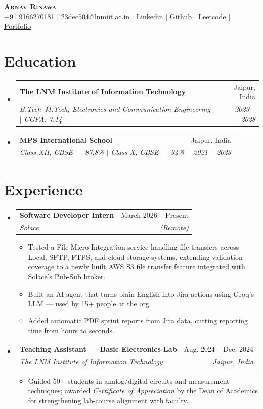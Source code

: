 \documentclass[letterpaper,11pt]{article}
\makeatletter
\newcommand{\resumeItem}[1]{
  \item\small{
    {#1 \vspace{-2pt}}
  }
}
\newcommand{\resumeSubheading}[4]{
  \vspace{-2pt}\item
    \begin{tabular*}{0.97\textwidth}[t]{l@{\extracolsep{\fill}}r}
      \textbf{#1} & #2 \\
      \textit{\small#3} & \textit{\small #4} \\
    \end{tabular*}\vspace{-7pt}
}
\newcommand{\resumeSubHeadingListStart}{\begin{itemize}[leftmargin=0.15in, label={}]}
\newcommand{\resumeSubHeadingListEnd}{\end{itemize}}
\newcommand{\resumeItemListStart}{\begin{itemize}}
\newcommand{\resumeItemListEnd}{\end{itemize}\vspace{-5pt}}
\makeatother
\begin{document}
\begin{center}
    \textbf{\Huge \scshape Arnav Rinawa} \\ \vspace{1pt}
    \small +91 9166270181 $|$
    \href{mailto:23dec504@lnmiit.ac.in}{\underline{23dec504@lnmiit.ac.in}} $|$
    \href{https://www.linkedin.com/in/arnav-rinawa}{\underline{Linkedin}} $|$
    \href{https://github.com/ARSOULGOD}{\underline{Github}} $|$
    \href{https://leetcode.com/u/arnav_rinawa}{\underline{Leetcode}} $|$
    \href{https://arsoulgod-github-io-git-main-arsoulgods-projects.vercel.app/}{\underline{Portfolio}}
\end{center}


\section{Education}
  \resumeSubHeadingListStart
    \resumeSubheading
      {The LNM Institute of Information Technology}{Jaipur, India}
      {B.Tech--M.Tech, Electronics and Communication Engineering $|$ CGPA: 7.14}{2023 -- 2028}
    \resumeSubheading
      {MPS International School}{Jaipur, India}
      {Class XII, CBSE --- 87.8\% $|$ Class X, CBSE --- 94\%}{2021 -- 2023}
  \resumeSubHeadingListEnd



\section{Experience}
  \resumeSubHeadingListStart
    \resumeSubheading
      {Software Developer Intern}{March 2026 -- Present}
      {Solace}{(Remote)}
      \resumeItemListStart
        \resumeItem{Tested a File Micro-Integration service handling file transfers across Local, SFTP, FTPS, and cloud storage systems, extending validation coverage to a newly built AWS S3 file transfer feature integrated with Solace's Pub-Sub broker.}
        \resumeItem{Built an AI agent that turns plain English into Jira actions using Groq's LLM — used by 15+ people at the org.}
        \resumeItem{Added automatic PDF sprint reports from Jira data, cutting reporting time from hours to seconds.}
      \resumeItemListEnd
    \resumeSubheading
      {Teaching Assistant --- Basic Electronics Lab}{Aug. 2024 -- Dec. 2024}
      {The LNM Institute of Information Technology}{Jaipur, India}
      \resumeItemListStart
                \resumeItem{Guided 50+ students in analog/digital circuits and measurement techniques; awarded \textit{Certificate of Appreciation} by the Dean of Academics for strengthening lab-course alignment with faculty.}
      \resumeItemListEnd
  \resumeSubHeadingListEnd
\end{document}
